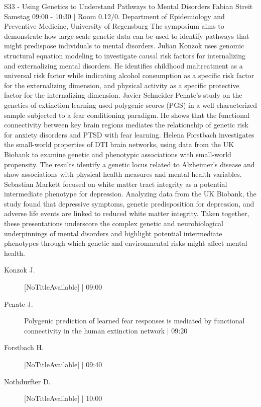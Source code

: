 
            \begin{symposium}
            {S33 - Using Genetics to Understand Pathways to Mental Disorders}
            {Fabian Streit}
            {Samstag 09:00 - 10:30 | Room 0.12/0.}
            {Department of Epidemiology and Preventive Medicine, University of Regensburg}
            The symposium aims to demonstrate how large-scale genetic data can be used to identify pathways that might predispose individuals to mental disorders.
Julian Konzok uses genomic structural equation modeling to investigate causal risk factors for internalizing and externalizing mental disorders. He identifies childhood maltreatment as a universal risk factor while indicating alcohol consumption as a specific risk factor for the externalizing dimension, and physical activity as a specific protective factor for the internalizing dimension.
Javier Schneider Penate's study on the genetics of extinction learning used polygenic scores (PGS) in a well-characterized sample subjected to a fear conditioning paradigm. He shows that the functional connectivity between key brain regions mediates the relationship of genetic risk for anxiety disorders and PTSD with fear learning.
Helena Forstbach investigates the small-world properties of DTI brain networks, using data from the UK Biobank to examine genetic and phenotypic associations with small-world propensity. The results identify a genetic locus related to Alzheimer's disease and show associations with physical health measures and mental health variables.
Sebastian Markett focused on white matter tract integrity as a potential intermediate phenotype for depression. Analyzing data from the UK Biobank, the study found that depressive symptoms, genetic predisposition for depression, and adverse life events are linked to reduced white matter integrity.
Taken together, these presentations underscore the complex genetic and neurobiological underpinnings of mental disorders and highlight potential intermediate phenotypes through which genetic and environmental risks might affect mental health.
            \begin{description}    
            
                \item [ Konzok J.] [NoTitleAvailable] \textcolor{mygray}{ | 09:00}    
                
                \item [ Penate J.] Polygenic prediction of learned fear responses is mediated by functional connectivity in the human extinction network \textcolor{mygray}{ | 09:20}    
                
                \item [ Forstbach H.] [NoTitleAvailable] \textcolor{mygray}{ | 09:40}    
                
                \item [ Nothdurfter D.] [NoTitleAvailable] \textcolor{mygray}{ | 10:00}    
                
            \end{description} 
            \end{symposium}
            